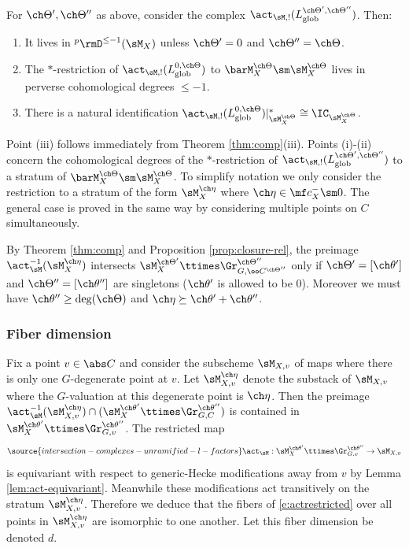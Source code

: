 \begin{prop}
\notready \label{prop:heckeIC}
For $\ch\Theta',\ch\Theta''$ as above,
consider the complex $\act_{\sM,!}(L^{\ch\Theta',\ch\Theta''}_{\mathrm{glob}})$.
Then:
\begin{enumerate}
\item It lives in $^p\rmD^{\le -1}(\sM_X)$ unless $\ch\Theta'=0$ and $\ch\Theta''=\ch\Theta$.
\item The $*$-restriction of
$\act_{\sM,!}(L^{0,\ch\Theta}_{\mathrm{glob}})$ to $\barM^{\ch\Theta}_X\sm \sM^{\ch\Theta}_X$ lives in perverse cohomological degrees $\le -1$.
\item There is a natural identification
$\act_{\sM,!}(L^{0,\ch\Theta}_{\mathrm{glob}})|^*_{\sM^{\ch\Theta}_X} \cong \IC_{\sM^{\ch\Theta}_X}$.
\end{enumerate}
\end{prop}

Point (iii) follows immediately from Theorem \ref{thm:comp}(iii).
Points (i)-(ii) concern the cohomological degrees
of the $*$-restriction of $\act_{\sM,!}(L^{\ch\Theta',\ch\Theta''}_{\mathrm{glob}})$
to a stratum of $\barM^{\ch\Theta}_X \sm \sM_X^{\ch\Theta}$.
To simplify notation we only consider the restriction
to a stratum of the form $\sM_X^{\ch\eta}$ where $\ch\eta \in \mf c_X^- \sm 0$.
The general case is proved in the same way by considering multiple points on $C$
simultaneously.



By Theorem \ref{thm:comp} and Proposition \ref{prop:closure-rel}, the preimage
$\act_\sM^{-1}(\sM_X^{\ch\eta})$ intersects $\sM_X^{\ch\Theta'} \ttimes \Gr^{\ch\Theta''}_{G,\oo C^{\ch\Theta''}}$ only if
$\ch\Theta' = [\ch\theta']$ and $\ch\Theta'' = [\ch\theta'']$ are singletons
($\ch\theta'$ is allowed to be $0$).
Moreover we must have $\ch\theta'' \ge \deg(\ch\Theta)$ and $\ch\eta \succeq \ch\theta' + \ch\theta''$.

\subsubsection{Fiber dimension}
Fix a point $v \in \abs C$ and consider the subscheme $\sM_{X,v}$
of maps where there is only one $G$-degenerate point at $v$.
Let $\sM_{X,v}^{\ch\eta}$ denote the substack of $\sM_{X,v}$ where the $G$-valuation at
this degenerate point is $\ch\eta$.
Then the preimage $\act_\sM^{-1}(\sM_{X,v}^{\ch\eta}) \cap (\sM_X^{\ch\theta'} \ttimes \Gr^{\ch\theta''}_{G,C})$ is contained in $\sM_X^{\ch\theta'} \ttimes \Gr^{\ch\theta''}_{G,v}$.
The restricted map
\begin{equation} \label{e:actrestricted}
\source{intersection-complexes-unramified-l-factors}
 \act_\sM : \sM_X^{\ch\theta'} \ttimes \Gr^{\ch\theta''}_{G,v} \to \sM_{X,v}
\end{equation}
is equivariant with respect to generic-Hecke modifications away from $v$ by Lemma \ref{lem:act-equivariant}. Meanwhile these modifications act transitively on the stratum
$\sM_{X,v}^{\ch\eta}$.
Therefore we deduce that the fibers of \eqref{e:actrestricted} over
all points in $\sM_{X,v}^{\ch\eta}$  are isomorphic to one another.
Let this fiber dimension be denoted $d$.

